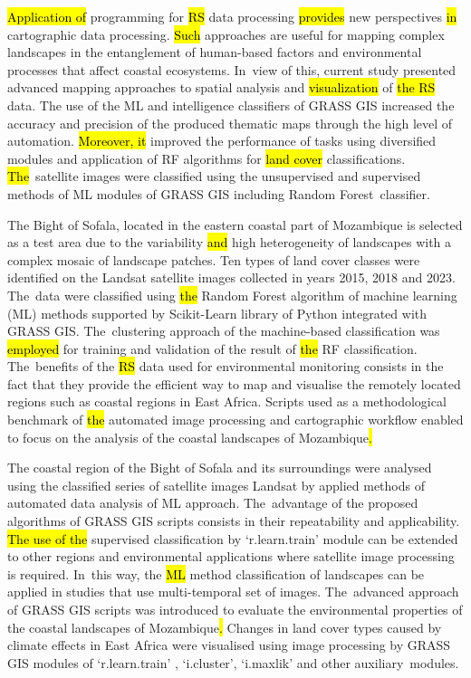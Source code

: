 \documentclass[coasts,article,accept,pdftex,oneauthor]{Definitions/mdpi}
\begin{document}
{\hl{Application of }programming for \hl{RS} data processing \hl{provides} new perspectives \hl{in} cartographic data processing. \hl{Such} approaches are useful for mapping complex landscapes in the entanglement of human-based factors and environmental processes that affect coastal ecosystems. In~view of this, current study presented advanced mapping approaches to spatial analysis and \hl{visualization} of \hl{the RS} data}. {The} use of the ML and intelligence classifiers of GRASS GIS increased the accuracy and precision of the produced thematic maps through the high level of automation. \hl{Moreover, it} improved the performance of tasks using diversified modules and application of RF algorithms for \hl{land cover} classifications. \hl{The}~{satellite }images were classified using {the }unsupervised and supervised\hl{ }methods of ML modules of GRASS GIS including Random Forest~classifier. 

The Bight of Sofala, located in the eastern coastal part of Mozambique is {selected} as a test area {due to the variability \hl{and} high heterogeneity of landscapes with a complex mosaic of landscape patches}. Ten types of land cover classes were identified on the {Landsat satellite }images {collected in years 2015, 2018 and 2023. The~data were }classified using \hl{the} Random Forest algorithm of machine learning (ML) methods supported by Scikit-Learn library of Python integrated with GRASS GIS. The~clustering approach of the machine-based classification was \hl{employed} for training and validation of the result of \hl{the} RF classification. The~{benefits} of the{ }\hl{RS} data{ used }for environmental monitoring {consists in the fact} that {they} provide the efficient way to map and visualise the remotely located regions\hl{ }such as coastal regions in East Africa. Scripts\hl{ }used as a\hl{ }methodological benchmark of \hl{the} automated image processing and cartographic workflow enabled to focus on the analysis of the coastal landscapes of Mozambique\hl{.} 

The coastal region of the Bight of Sofala and {its }surroundings were analysed {using} the classified series of {satellite }images {Landsat by applied methods of }automated data analysis of ML approach. The~{advantage of the }proposed algorithms of GRASS GIS scripts {consists in their repeatability and applicability. }\hl{The use of the }supervised classification by `r.learn.train' module can be\hl{ }extended to other regions and environmental applications where satellite image processing is required{. In~this way, the \hl{ML} method} classification of landscapes{\hl{ }can be applied in\hl{ }studies that use} multi-temporal set of\hl{ }images. The~advanced approach of GRASS GIS scripts was introduced to evaluate the environmental properties of the coastal landscapes of Mozambique\hl{. }Changes in land cover types caused by climate effects in East Africa were visualised using image processing by GRASS GIS modules of `r.learn.train' , `i.cluster', `i.maxlik' and other auxiliary~modules. 
\end{document}

